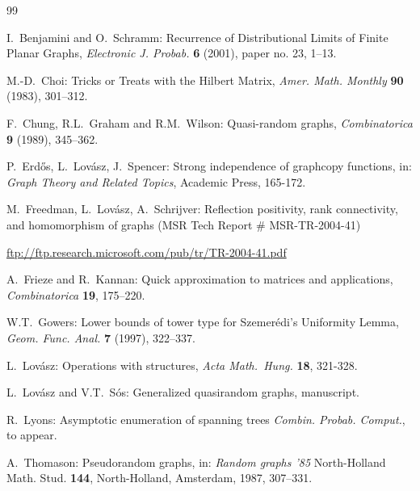 \documentclass[fleqn]{article}
\begin{document}
\begin{thebibliography}{99}

I.~Benjamini and O.~Schramm: Recurrence of Distributional Limits of
Finite Planar Graphs, {\it Electronic J. Probab.} {\bf 6} (2001),
paper no. 23, 1--13.

M.-D.~Choi: Tricks or Treats with the Hilbert Matrix, {\it Amer.
Math. Monthly} {\bf 90} (1983), 301--312.

F.~Chung, R.L.~Graham and R.M.~Wilson: Quasi-random graphs, {\it
Combinatorica} {\bf 9} (1989), 345--362.

P.~Erd\H{o}s, L.~Lov\'asz, J.~Spencer: Strong independence of
graphcopy functions, in: {\it Graph Theory and Related Topics},
Academic Press, 165-172.


M.~Freedman, L.~Lov\'asz, A.~Schrijver: Reflection positivity, rank
connectivity, and homomorphism of graphs (MSR Tech Report \#
MSR-TR-2004-41)

\url{ftp://ftp.research.microsoft.com/pub/tr/TR-2004-41.pdf}

A.~Frieze and R.~Kannan: Quick approximation to matrices and
applications, {\it Combinatorica} {\bf 19}, 175--220.

W.T.~Gowers: Lower bounds of tower type for Szemer\'edi's Uniformity
Lemma, {\it Geom. Func. Anal.} {\bf 7} (1997), 322--337.

L.~Lov\'asz: Operations with structures, {\it Acta Math.\ Hung.} {\bf
18}, 321-328.

L.~Lov\'asz and V.T.~S\'os: Generalized quasirandom graphs,
manuscript.

R.~Lyons: Asymptotic enumeration of spanning trees {\it Combin.
Probab. Comput.}, to appear.

A.~Thomason: Pseudorandom graphs, in: {\it Random graphs '85}
North-Holland Math. Stud. {\bf 144}, North-Holland, Amsterdam, 1987,
307--331.

\end{thebibliography}
\end{document}
